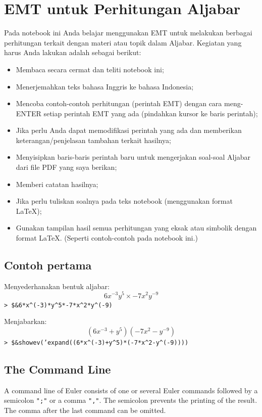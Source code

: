 \documentclass[11pt, a4paper]{article}
\newcommand{\emtcmd}[1]{\noindent\texttt{\textcolor{emtcommand}{>}\ #1}\par\smallskip}
\begin{document}
\section*{EMT untuk Perhitungan Aljabar}

Pada notebook ini Anda belajar menggunakan EMT untuk melakukan berbagai perhitungan terkait dengan materi atau topik dalam Aljabar. Kegiatan yang harus Anda lakukan adalah sebagai berikut:

\begin{itemize}
    \item Membaca secara cermat dan teliti notebook ini;
    \item Menerjemahkan teks bahasa Inggris ke bahasa Indonesia;
    \item Mencoba contoh-contoh perhitungan (perintah EMT) dengan cara meng-ENTER setiap perintah EMT yang ada (pindahkan kursor ke baris perintah);
    \item Jika perlu Anda dapat memodifikasi perintah yang ada dan memberikan keterangan/penjelasan tambahan terkait hasilnya;
    \item Menyisipkan baris-baris perintah baru untuk mengerjakan soal-soal Aljabar dari file PDF yang saya berikan;
    \item Memberi catatan hasilnya;
    \item Jika perlu tuliskan soalnya pada teks notebook (menggunakan format LaTeX);
    \item Gunakan tampilan hasil semua perhitungan yang eksak atau simbolik dengan format LaTeX. (Seperti contoh-contoh pada notebook ini.)
\end{itemize}

\subsection*{Contoh pertama}

Menyederhanakan bentuk aljabar:
$$6x^{-3}y^5\times -7x^2y^{-9}$$
\emtcmd{\$\&6*x\^{}(-3)*y\^{}5*-7*x\^{}2*y\^{}(-9)}

Menjabarkan:
$$(6x^{-3}+y^5)(-7x^2-y^{-9})$$
\emtcmd{\$\&showev('expand((6*x\^{}(-3)+y\^{}5)*(-7*x\^{}2-y\^{}(-9))))}

\subsection*{The Command Line}

A command line of Euler consists of one or several Euler commands followed by a semicolon \texttt{";"} or a comma \texttt{","}. The semicolon prevents the printing of the result. The comma after the last command can be omitted.
\end{document}
